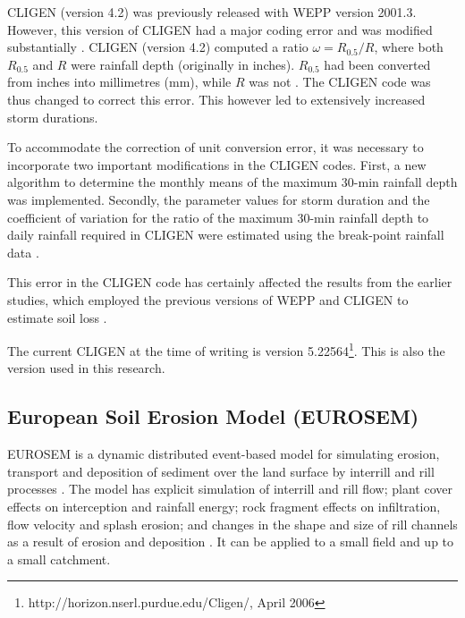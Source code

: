 CLIGEN (version 4.2) was previously released with WEPP version 2001.3. However,
this version of CLIGEN had a major coding error and was modified substantially
\citep{yu2000-301}. CLIGEN (version 4.2) computed a ratio $\omega = R_{0.5}/R$,
where both $R_{0.5}$ and $R$ were rainfall depth (originally in inches).
$R_{0.5}$ had been converted from inches into millimetres (mm), while $R$ was
not \citep{yu2000-301}. The CLIGEN code was thus changed to correct this error.
This however led to extensively increased storm durations.

To accommodate the correction of unit conversion error, it was necessary to
incorporate two important modifications in the CLIGEN codes. First, a new
algorithm to determine the monthly means of the maximum 30-min rainfall depth
was implemented. Secondly, the parameter values for storm duration and the
coefficient of variation for the ratio of the maximum 30-min rainfall depth to
daily rainfall required in CLIGEN were estimated using the break-point rainfall
data \citep{yu2000-301}.

This error in the CLIGEN code has certainly affected the results from the
earlier studies, which employed the previous versions of WEPP and CLIGEN to
estimate soil loss
\citep{truman1993-405,zhang1995-1069,zhang1995-1079,zhang1996-855,
baffaut1996-447,laflen1997-96,baffaut1998-756,favis1999-329}.

The current CLIGEN at the time of writing is version
5.22564\footnote{http://horizon.nserl.purdue.edu/Cligen/, April 2006}. This is
also the version used in this research.


\subsection{European Soil Erosion Model (EUROSEM)}
\label{sec:EuropeanSoilErosionModelEUROSEM}

EUROSEM is a dynamic distributed event-based model for simulating erosion,
transport and deposition of sediment over the land surface by interrill and rill
processes \citep{morgan1998-389}. The model has explicit simulation of interrill
and rill flow; plant cover effects on interception and rainfall energy; rock
fragment effects on infiltration, flow velocity and splash erosion; and changes
in the shape and size of rill channels as a result of erosion and deposition
\citep{morgan1998-389}. It can be applied to a small field and up to a small
catchment.

